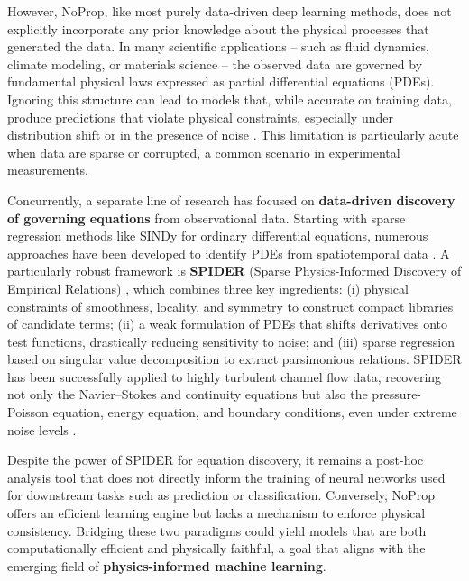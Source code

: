 \documentclass[preprint,12pt]{elsarticle}
\begin{document}
However, NoProp, like most purely data-driven deep learning methods, does not explicitly incorporate any prior knowledge about the physical processes that generated the data. In many scientific applications -- such as fluid dynamics, climate modeling, or materials science -- the observed data are governed by fundamental physical laws expressed as partial differential equations (PDEs). Ignoring this structure can lead to models that, while accurate on training data, produce predictions that violate physical constraints, especially under distribution shift or in the presence of noise \cite{raissi2019physics}. This limitation is particularly acute when data are sparse or corrupted, a common scenario in experimental measurements.

Concurrently, a separate line of research has focused on \textbf{data-driven discovery of governing equations} from observational data. Starting with sparse regression methods like SINDy \cite{brunton2016discovering} for ordinary differential equations, numerous approaches have been developed to identify PDEs from spatiotemporal data \cite{rudy2017data,schaeffer2017learning,raissi2018hidden,gurevich2019robust,reinbold2020using,messenger2021weak,kaheman2020sindy}. A particularly robust framework is \textbf{SPIDER} (Sparse Physics-Informed Discovery of Empirical Relations) \cite{gurevich2024learning}, which combines three key ingredients: (i) physical constraints of smoothness, locality, and symmetry to construct compact libraries of candidate terms; (ii) a weak formulation of PDEs that shifts derivatives onto test functions, drastically reducing sensitivity to noise; and (iii) sparse regression based on singular value decomposition to extract parsimonious relations. SPIDER has been successfully applied to highly turbulent channel flow data, recovering not only the Navier--Stokes and continuity equations but also the pressure-Poisson equation, energy equation, and boundary conditions, even under extreme noise levels \cite{gurevich2024learning}.

Despite the power of SPIDER for equation discovery, it remains a post-hoc analysis tool that does not directly inform the training of neural networks used for downstream tasks such as prediction or classification. Conversely, NoProp offers an efficient learning engine but lacks a mechanism to enforce physical consistency. Bridging these two paradigms could yield models that are both computationally efficient and physically faithful, a goal that aligns with the emerging field of \textbf{physics-informed machine learning}\cite{raissi2019physics,karniadakis2021physics,willard2020integrating,karpatne2017theory}.
\end{document}
